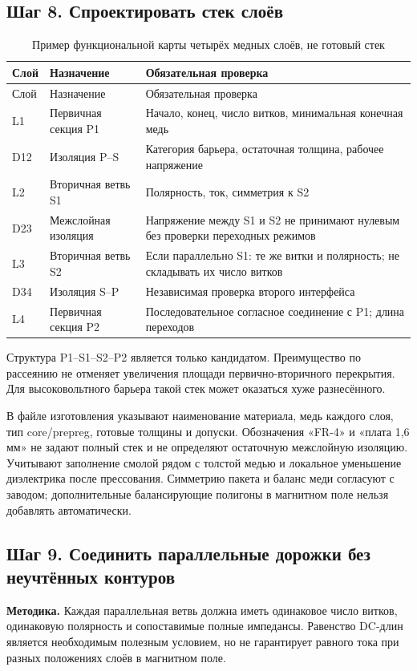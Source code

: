 \documentclass[14pt,a4paper]{extarticle}
\newcommand{\method}{\par\noindent\textbf{Методика.} }
\begin{document}
\subsection{Шаг 8. Спроектировать стек слоёв}
\begin{longtable}{>{\raggedright\arraybackslash}p{18mm}>{\raggedright\arraybackslash}p{42mm}>{\raggedright\arraybackslash}p{94mm}}
\caption{Пример функциональной карты четырёх медных слоёв, не готовый стек}\label{pl:stack-example}\\
\toprule Слой & Назначение & Обязательная проверка\\\midrule\endfirsthead
\toprule Слой & Назначение & Обязательная проверка\\\midrule\endhead
L1 & Первичная секция P1 & Начало, конец, число витков, минимальная конечная медь\\
D12 & Изоляция P--S & Категория барьера, остаточная толщина, рабочее напряжение\\
L2 & Вторичная ветвь S1 & Полярность, ток, симметрия к S2\\
D23 & Межслойная изоляция & Напряжение между S1 и S2 не принимают нулевым без проверки переходных режимов\\
L3 & Вторичная ветвь S2 & Если параллельно S1: те же витки и полярность; не складывать их число витков\\
D34 & Изоляция S--P & Независимая проверка второго интерфейса\\
L4 & Первичная секция P2 & Последовательное согласное соединение с P1; длина переходов\\
\bottomrule
\end{longtable}
Структура P1--S1--S2--P2 является только кандидатом. Преимущество по рассеянию не отменяет увеличения площади первично-вторичного перекрытия. Для высоковольтного барьера такой стек может оказаться хуже разнесённого.

В файле изготовления указывают наименование материала, медь каждого слоя, тип core/prepreg, готовые толщины и допуски. Обозначения «FR-4» и «плата 1,6 мм» не задают полный стек и не определяют остаточную межслойную изоляцию. Учитывают заполнение смолой рядом с толстой медью и локальное уменьшение диэлектрика после прессования. Симметрию пакета и баланс меди согласуют с заводом; дополнительные балансирующие полигоны в магнитном поле нельзя добавлять автоматически.\cite{web19,web20,web22}

\subsection{Шаг 9. Соединить параллельные дорожки без неучтённых контуров}
\method Каждая параллельная ветвь должна иметь одинаковое число витков, одинаковую полярность и сопоставимые полные импедансы. Равенство DC-длин является необходимым полезным условием, но не гарантирует равного тока при разных положениях слоёв в магнитном поле.
\end{document}
